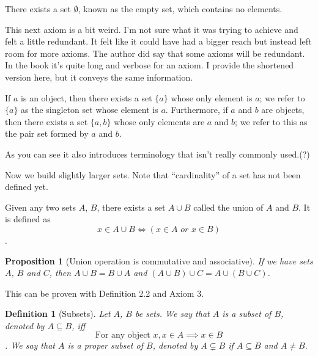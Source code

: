 \documentclass[12pt]{article}
\newtheorem{proposition}{Proposition}[section]
\newtheorem{definition}{Definition}[section]
\theoremstyle{remark}
\begin{document}

\begin{important}
     There exists a set $ \emptyset $, known as the empty set, which contains no elements. 
\end{important}


This next axiom is a bit weird. I'm not sure what it was trying to achieve and felt a little redundant. It felt like it could have had a bigger reach but instead left room for more axioms. The author did say that some axioms will be redundant. In the book it's quite long and verbose for an axiom. I provide the shortened version here, but it conveys the same information. 


\begin{important}
 	If $ a $ is an object, then there exists a set $ \{a\} $ whose only element is $ a $; we refer to $ \{a\} $ as the singleton set whose element is $ a $. Furthermore, if $ a $ and $ b $ are objects, then there exists a set $ \{a,b\} $ whose only elements are $ a $ and $ b $; we refer to this as the pair set formed by $ a $ and $ b $.
\end{important}

As you can see it also introduces terminology that isn't really commonly used.(?) \par 

Now we build slightly larger sets. Note that ``cardinality'' of a set has not been defined yet. 


\begin{important}
 	Given any two sets $ A $, $ B $, there exists a set $ A \cup B $ called the union of $ A $ and $ B $. It is defined as \[ x \in A \cup B \iff (x \in A \textit{ or } x \in B) \].
\end{important}


\begin{proposition}[Union operation is commutative and associative]
    If we have sets $ A $, $ B $ and $ C $, then $ A \cup B = B \cup A $ and $ (A \cup B) \cup C = A \cup (B \cup C) $.
\end{proposition}

This can be proven with Definition 2.2 and Axiom 3.


\begin{definition}[Subsets]
	Let $ A $, $ B $ be sets. We say that $ A $ is a \textit{subset} of $ B $, denoted by $ A \subseteq B $, iff \[ \text{For any object } x, x \in A \implies x \in B \].
	We say that $ A $ is a proper subset of $ B $, denoted by $ A \subsetneq B $ if $ A \subseteq B $ and $ A \neq B $.
\end{definition}
\end{document}
